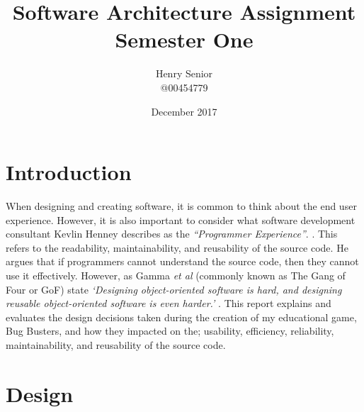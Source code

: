 \documentclass[a4paper,12pt]{article}
\begin{document}
	
\title{Software Architecture Assignment Semester One}
\author{Henry Senior\\@00454779}
\date{December 2017}

\maketitle

\section*{Introduction}
When designing and creating software, it is common to think about the end user experience. However, it is also important to consider what software development consultant Kevlin Henney describes as the \textit{``Programmer Experience''}. \cite{FizzBuzz}. This refers to the readability, maintainability, and reusability of the source code. He argues that if programmers cannot understand the source code, then they cannot use it effectively. However, as Gamma \textit{et al} (commonly known as The Gang of Four or GoF) state \textit{`Designing object-oriented software is hard, and designing reusable object-oriented software is even harder.'} \cite{GoF-Book}. This report explains and evaluates the design decisions taken during the creation of my educational game, Bug Busters, and how they impacted on the; usability, efficiency, reliability, maintainability, and reusability of the source code. 

\section*{Design}
\end{document}
